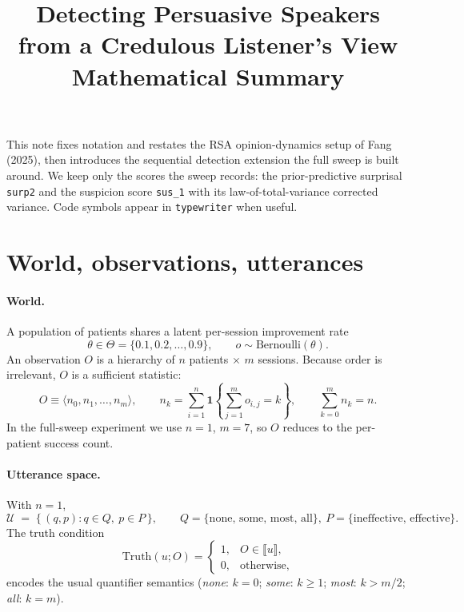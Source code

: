 \documentclass[11pt]{article}
\title{Detecting Persuasive Speakers from a Credulous Listener's View\\
       \large Mathematical Summary}
\author{}
\date{}
\newcommand{\Obs}{O}                 %
\newcommand{\Utt}{u}                 %
\newcommand{\UttSet}{\mathcal{U}}
\newcommand{\Truth}{\mathrm{Truth}}
\newcommand{\ind}{\mathbf{1}}
\begin{document}
\maketitle

\noindent
This note fixes notation and restates the RSA opinion-dynamics setup of
Fang (2025), then introduces the sequential detection extension the full
sweep is built around. We keep only the scores the sweep records: the
prior-predictive surprisal \texttt{surp2} and the suspicion score
\texttt{sus\_1} with its law-of-total-variance corrected variance. Code
symbols appear in \texttt{typewriter} when useful.

\section{World, observations, utterances}

\paragraph{World.} A population of patients shares a latent per-session
improvement rate
\[
    \theta \in \Theta = \{0.1, 0.2, \ldots, 0.9\},
    \qquad
    o \sim \mathrm{Bernoulli}(\theta).
\]
An observation \(\Obs\) is a hierarchy of $n$ patients $\times$ $m$
sessions. Because order is irrelevant, $\Obs$ is a sufficient statistic:
\[
    \Obs \equiv \langle n_0, n_1, \ldots, n_m\rangle,
    \qquad
    n_k = \sum_{i=1}^n \ind\!\left\{\sum_{j=1}^m o_{i,j} = k\right\},
    \qquad
    \sum_{k=0}^m n_k = n.
\]
In the full-sweep experiment we use $n=1$, $m=7$, so $\Obs$ reduces to
the per-patient success count.

\paragraph{Utterance space.} With $n = 1$,
\[
    \UttSet \;=\; \{\,(q, p) : q \in Q,\ p \in P\,\},
    \qquad
    Q = \{\text{none, some, most, all}\},\
    P = \{\text{ineffective, effective}\}.
\]
The truth condition
\[
    \Truth(\Utt; \Obs) =
    \begin{cases}
        1, & \Obs \in \llbracket \Utt \rrbracket, \\
        0, & \text{otherwise},
    \end{cases}
\]
encodes the usual quantifier semantics (\emph{none}: $k=0$; \emph{some}:
$k \ge 1$; \emph{most}: $k > m/2$; \emph{all}: $k = m$).
\end{document}
